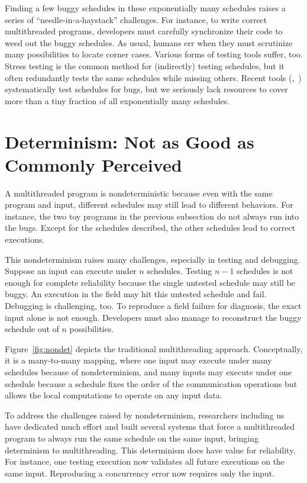 Finding a few buggy schedules in these exponentially many schedules raises
a series of ``needle-in-a-haystack'' challenges.  For instance, to write
correct multithreaded programs, developers must carefully synchronize
their code to weed out the buggy schedules.  As usual, humans err when
they must scrutinize many possibilities to locate corner cases. Various
forms of testing tools suffer, too.  Stress testing is the common method
for (indirectly) testing schedules, but it often redundantly tests the
same schedules while missing others.  Recent tools
(\eg,~\cite{musuvathi:chess:osdi08}) systematically test schedules for bugs, but
we seriously lack resources to cover more than a tiny fraction of all
exponentially many schedules.

\section{Determinism: Not as Good as Commonly Perceived} \label{sec:smt-dmt}

A multithreaded program is nondeterministic because even with the same
program and input, different schedules may still lead to different
behaviors.  For instance, the two toy programs in the previous subsection
do not always run into the bugs.  Except for the schedules described, the
other schedules lead to correct executions.

This nondeterminism raises many challenges, especially in
testing and debugging.  Suppose an input can execute under $n$ schedules.
Testing $n-1$ schedules is not enough for complete reliability because the
single untested schedule may still be buggy.  An execution in the field
may hit this untested schedule and fail.  Debugging is challenging, too.
To reproduce a field failure for diagnosis, the exact input alone is not
enough. Developers must also manage to reconstruct the buggy schedule out
of $n$ possibilities.

Figure~\ref{fig:nondet} depicts the traditional multithreading approach.
Conceptually, it is a many-to-many mapping, where one input may execute
under many schedules because of nondeterminism, and many inputs may
execute under one schedule because a schedule fixes the order of the
communication operations but allows the local computations to operate on
any input data.


To address the challenges raised by nondeterminism, researchers including
us have dedicated much effort and built several systems that force a
multithreaded program to always run the same schedule on the same input,
bringing determinism to multithreading.  This determinism does have value
for reliability.  For instance, one testing execution now validates all
future executions on the same input.  Reproducing a concurrency error now
requires only the input.

